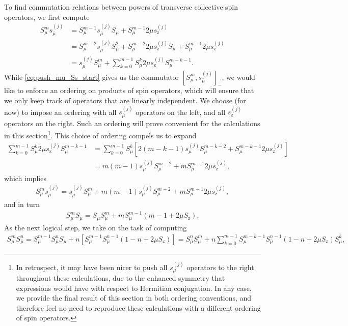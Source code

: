 \documentclass[aps,pra,twocolumn,longbibliography]{revtex4-2}
\newcommand{\p}[1]{\left( #1 \right)} %
\renewcommand{\sp}[1]{\left[ #1 \right]} %
\newcommand{\z}{\text{z}}
\newcommand{\bmu}{{\bar\mu}}
\newcommand{\1}{\mathds{1}}
\begin{document}
To find commutation relations between powers of transverse collective
spin operators, we first compute
\begin{align}
  S_\mu^m s_\bmu^{(j)}
  &= S_\mu^{m-1}s_\bmu^{(j)} S_\mu
  + S_\mu^{m-1} 2\mu s_\z^{(j)} \\
  &= S_\mu^{m-2} s_\bmu^{(j)} S_\mu^2
  + S_\mu^{m-2} 2\mu s_\z^{(j)} S_\mu
  + S_\mu^{m-1} 2\mu s_\z^{(j)} \\
  &= s_\bmu^{(j)} S_\mu^m
  + \sum_{k=0}^{m-1} S_\mu^k 2\mu s_\z^{(j)} S_\mu^{m-k-1}
  \label{eq:push_mu_Ss_start}.
\end{align}
While \eqref{eq:push_mu_Ss_start} gives us the commutator
$\sp{S_\mu^m,s_\bmu^{(j)}}_-$, we would like to enforce an ordering on
products of spin operators, which will ensure that we only keep track
of operators that are linearly independent.  We choose (for now) to
impose an ordering with all $s_\bmu^{(j)}$ operators on the left, and
all $s_\z^{(j)}$ operators on the right.  Such an ordering will prove
convenient for the calculations in this section\footnote{In
  retrospect, it may have been nicer to push all $s_\mu^{(j)}$
  operators to the right throughout these calculations, due to the
  enhanced symmetry that expressions would have with respect to
  Hermitian conjugation.  In any case, we provide the final result of
  this section in both ordering conventions, and therefore feel no
  need to reproduce these calculations with a different ordering of
  spin operators.}.  This choice of ordering compels us to expand
\begin{align}
  \sum_{k=0}^{m-1} S_\mu^k 2\mu s_\z^{(j)} S_\mu^{m-k-1}
  &= \sum_{k=0}^{m-1} S_\mu^k
  \sp{2\p{m-k-1} s_\mu^{(j)} S_\mu^{m-k-2}
    + S_\mu^{m-k-1} 2\mu s_\z^{(j)}} \\
  &= m \p{m-1} s_\mu^{(j)} S_\mu^{m-2}
  + m S_\mu^{m-1} 2\mu s_\z^{(j)},
\end{align}
which implies
\begin{align}
  S_\mu^m s_\bmu^{(j)}
  = s_\bmu^{(j)} S_\mu^m + m \p{m-1} s_\mu^{(j)} S_\mu^{m-2}
  + m S_\mu^{m-1} 2\mu s_\z^{(j)},
  \label{eq:push_mu_Ss}
\end{align}
and in turn
\begin{align}
  S_\mu^m S_\bmu = S_\bmu S_\mu^m
  + m S_\mu^{m-1} \p{m - 1 + 2\mu S_\z}.
  \label{eq:push_mu_single}
\end{align}
As the next logical step, we take on the task of computing
\begin{align}
  S_\mu^m S_\bmu^n
  = S_\mu^{m-1} S_\bmu^n S_\mu
  + n \sp{S_\mu^{m-1} S_\bmu^{n-1} \p{1 - n + 2\mu S_\z}}
  = S_\bmu^n S_\mu^m
  + n \sum_{k=0}^{m-1} S_\mu^{m-k-1} S_\bmu^{n-1}
  \p{1 - n + 2\mu S_\z} S_\mu^k,
\end{align}
\end{document}
